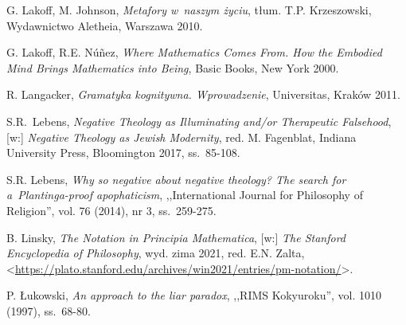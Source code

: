 \begin{thebibliography}{100}
G. Lakoff, M. Johnson, \textit{Metafory w~naszym życiu}, tłum. T.P. Krzeszowski, Wydawnictwo Aletheia, Warszawa 2010.

G. Lakoff, R.E. Núñez, \textit{Where Mathematics Comes From. How the Embodied Mind Brings Mathematics into Being}, Basic Books, New York 2000.

R. Langacker, \textit{Gramatyka kognitywna. Wprowadzenie}, Universitas, Kraków 2011.

S.R.~Lebens, \textit{Negative Theology as Illuminating and/or Therapeutic Falsehood}, [w:] \textit{Negative Theology as Jewish Modernity},
red. M. Fagenblat, Indiana University Press, Bloomington 2017, ss.~85-108.

S.R. Lebens, \textit{Why so negative about negative theology? The search for a~Plantinga-proof apophaticism},
,,International Journal for Philosophy of Religion'', vol. 76 (2014), nr 3, ss.~259-275.




B. Linsky, \textit{The Notation in Principia Mathematica}, [w:] \textit{The Stanford Encyclopedia of Philosophy},
wyd. zima 2021, red. E.N. Zalta, <\url{https://plato.stanford.edu/archives/win2021/entries/pm-notation/}>.


P. Łukowski, \textit{An approach to the liar paradox}, ,,RIMS Kokyuroku'', vol. 1010 (1997), ss.~68-80.


\end{thebibliography}
